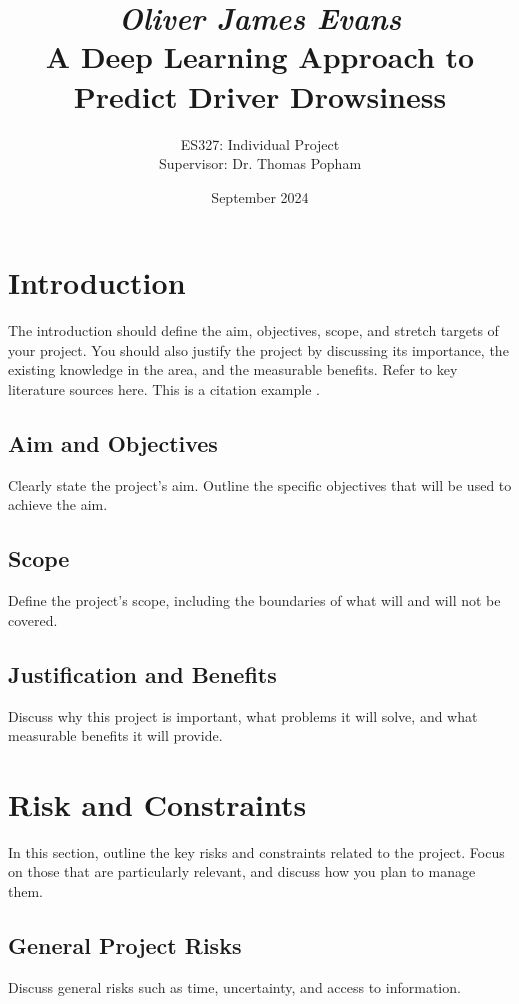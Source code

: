 \documentclass[a4paper, 11pt, twocolumn]{article}
\title{
    \textit{\large Oliver James Evans} \\ %
    \textbf{\LARGE A Deep Learning Approach to Predict Driver Drowsiness} %
}
\author{
    \normalsize ES327: Individual Project \\ %
    \normalsize Supervisor: Dr. Thomas Popham %
}
\date{
    \normalsize September 2024 %
}
\begin{document}
\maketitle

\section{Introduction}
\label{sec:introduction}
The introduction should define the aim, objectives, scope, and stretch targets of your project. You should also justify the project by discussing its importance, the existing knowledge in the area, and the measurable benefits. Refer to key literature sources here.
This is a citation example \citep{einstein}.
\subsection{Aim and Objectives}
Clearly state the project's aim. Outline the specific objectives that will be used to achieve the aim.

\subsection{Scope}
Define the project’s scope, including the boundaries of what will and will not be covered.

\subsection{Justification and Benefits}
Discuss why this project is important, what problems it will solve, and what measurable benefits it will provide.

\section{Risk and Constraints}
\label{sec:risks}
In this section, outline the key risks and constraints related to the project. Focus on those that are particularly relevant, and discuss how you plan to manage them.

\subsection{General Project Risks}
Discuss general risks such as time, uncertainty, and access to information.
\end{document}
